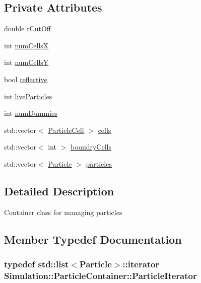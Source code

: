 \subsection*{Private Attributes}
\begin{DoxyCompactItemize}
\item 
double \hyperlink{classSimulation_1_1ParticleContainer_a1f0e9467546c765bf8533a307b5587e1}{r\-Cut\-Off}
\item 
int \hyperlink{classSimulation_1_1ParticleContainer_a26ff75d3f5c109fc354bb95e460bef20}{num\-Cells\-X}
\item 
int \hyperlink{classSimulation_1_1ParticleContainer_ae248a9742a4d62f0cc692214eef9ba63}{num\-Cells\-Y}
\item 
bool \hyperlink{classSimulation_1_1ParticleContainer_a53f222132c6a1177d3a14939e865de35}{reflective}
\item 
int \hyperlink{classSimulation_1_1ParticleContainer_abe3ee9f5e9a35e525809c6a01129948c}{live\-Particles}
\item 
int \hyperlink{classSimulation_1_1ParticleContainer_a36eded0724f9d476df35499387d33815}{num\-Dummies}
\item 
std\-::vector$<$ \hyperlink{classSimulation_1_1ParticleContainer_1_1ParticleCell}{Particle\-Cell} $>$ \hyperlink{classSimulation_1_1ParticleContainer_a3836f9563a3827414df5288a2f3fcee6}{cells}
\item 
std\-::vector$<$ int $>$ \hyperlink{classSimulation_1_1ParticleContainer_a4df9c8b9d1a1677e241a2b1fa3aa1c7d}{boundry\-Cells}
\item 
std\-::vector$<$ \hyperlink{classSimulation_1_1Particle}{Particle} $>$ \hyperlink{classSimulation_1_1ParticleContainer_ae99eb8aa1b2acbecb888dee8c32f6b18}{particles}
\end{DoxyCompactItemize}


\subsection{Detailed Description}
Container class for managing particles 

\subsection{Member Typedef Documentation}
\hypertarget{classSimulation_1_1ParticleContainer_ac9a1b3682da81d23bd530595d41766d6}{
\subsubsection[{Particle\-Iterator}]{\setlength{\rightskip}{0pt plus 5cm}typedef std\-::list$<${\bf Particle}$>$\-::iterator {\bf Simulation\-::\-Particle\-Container\-::\-Particle\-Iterator}\hspace{0.3cm}{\ttfamily [private]}}}\label{classSimulation_1_1ParticleContainer_ac9a1b3682da81d23bd530595d41766d6}


